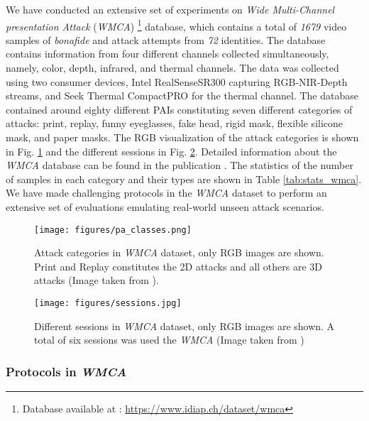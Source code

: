 \documentclass[journal]{IEEEtran}
\begin{document}
 We have conducted an extensive set of experiments on \textit{Wide Multi-Channel presentation Attack} (\textit{WMCA}) \footnote{Database available at : \url{https://www.idiap.ch/dataset/wmca}} database, which contains a total of \textit{1679} video samples of \textit{bonafide} and attack attempts from \textit{72} identities. The database contains information from four different channels collected simultaneously, namely, color, depth, infrared, and thermal channels. The data was collected using two consumer devices,  Intel\textsuperscript{\textregistered} RealSense\texttrademark SR300 capturing RGB-NIR-Depth streams, and Seek Thermal CompactPRO for the thermal channel. The database contained around eighty different PAIs constituting seven different categories of attacks: print, replay, funny eyeglasses, fake head, rigid mask, flexible silicone mask, and paper masks. The RGB visualization of the attack categories is shown in Fig. \ref{fig:pa_wmca} and the different sessions in Fig. \ref{fig:sessions_wmca}. Detailed information about the \textit{WMCA} database can be found in the publication \cite{george_mccnn_tifs2019}. The statistics of the number of samples in each category and their types are shown in Table \ref{tab:stats_wmca}. We have made challenging protocols in the \textit{WMCA} dataset to perform an extensive set of evaluations emulating real-world unseen attack scenarios.

\begin{figure}[h]
     \centering
         \texttt{[image: figures/pa\_classes.png]}

\caption{Attack categories in \textit{WMCA} dataset, only RGB images are shown. Print and Replay constitutes the 2D attacks and all others are 3D attacks (Image taken from \cite{george_mccnn_tifs2019}).}
\label{fig:pa_wmca}
\end{figure}
\begin{figure}[h]
     \centering
         \texttt{[image: figures/sessions.jpg]}

\caption{Different sessions in \textit{WMCA} dataset, only RGB images are shown. A total of six sessions was used the \textit{WMCA} (Image taken from \cite{george_mccnn_tifs2019})}
\label{fig:sessions_wmca}
\end{figure}

\subsubsection{Protocols in \textit{WMCA}}
\end{document}
